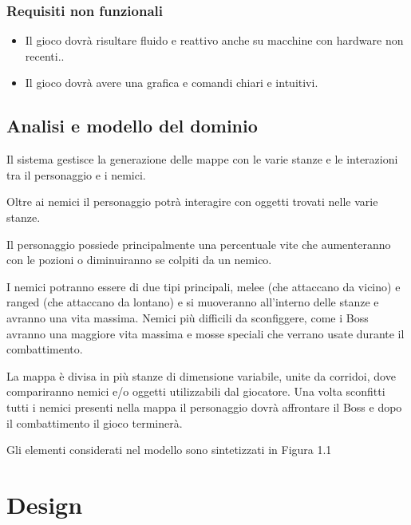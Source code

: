 \documentclass[a4paper,12pt]{report}
\begin{document}
    \subsection{Requisiti non funzionali}
    \begin{itemize}
        \item Il gioco dovrà risultare fluido e reattivo anche su macchine con hardware non recenti..
        \item Il gioco dovrà avere una grafica e comandi chiari e intuitivi.
    \end{itemize}
    \section{Analisi e modello del dominio}
    \par Il sistema gestisce la generazione delle mappe con le varie stanze e le interazioni tra il
    personaggio e i nemici.
    \par Oltre ai nemici il personaggio potrà interagire con oggetti trovati nelle varie stanze.
    \par Il personaggio possiede principalmente una percentuale vite che aumenteranno con le pozioni
    o diminuiranno se colpiti da un nemico.
    \par I nemici potranno essere di due tipi principali, melee (che attaccano da vicino) e ranged (che attaccano da lontano)
    e si muoveranno all'interno delle stanze e avranno una vita massima. Nemici più difficili da sconfiggere,
    come i Boss avranno una maggiore vita massima e mosse speciali che verrano usate durante il combattimento.
    \par La mappa è divisa in più stanze di dimensione variabile, unite da corridoi, dove compariranno nemici
    e/o oggetti utilizzabili dal giocatore.
    Una volta sconfitti tutti i nemici presenti nella mappa il personaggio dovrà affrontare il Boss e dopo il
    combattimento il gioco terminerà.
    \par \par Gli elementi considerati nel modello sono sintetizzati in Figura 1.1


    \chapter{Design}
\end{document}
